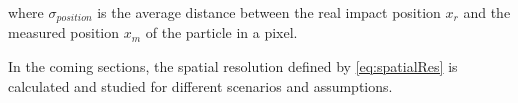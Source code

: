 where $\sigma_{position}$ is the average distance between the real
impact position $x_r$ and the measured position $x_m$ of the
particle in a pixel.

In the coming sections, the spatial resolution defined by
\cref{eq:spatialRes} is calculated and studied for different scenarios
and assumptions.

      
      
      

